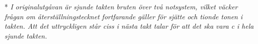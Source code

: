 \vspace{5mm}
* \textit{I originalutgåvan är sjunde takten bruten över två notsystem, vilket väcker frågan om
återställningstecknet fortfarande gäller för sjätte och tionde tonen i takten.
Att det uttryckligen står ciss i nästa takt talar för att det ska vara c i hela sjunde takten.}